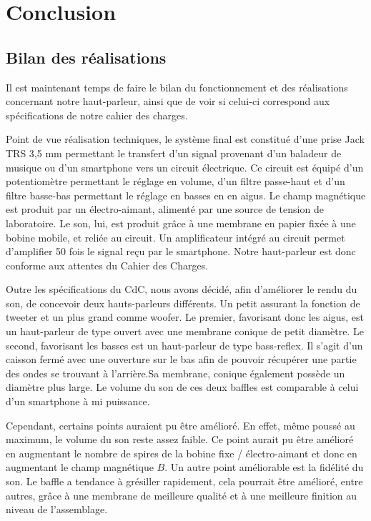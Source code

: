 \chapter{Conclusion}

\section{Bilan des réalisations}

Il est maintenant temps de faire le bilan du fonctionnement et des réalisations concernant notre haut-parleur, ainsi que de voir si celui-ci correspond aux spécifications de notre cahier des charges.

Point de vue réalisation techniques, le système final est constitué d'une prise Jack TRS 3,5 mm permettant le transfert d'un signal provenant d'un baladeur de musique ou d'un smartphone vers un circuit électrique. Ce circuit est équipé d'un potentiomètre permettant le réglage en volume, d'un filtre passe-haut et d'un filtre basse-bas permettant le réglage en basses en en aigus. Le champ magnétique est produit par un électro-aimant, alimenté par une source de tension de laboratoire. Le son, lui, est produit grâce à une membrane en papier fixée à une bobine mobile, et reliée au circuit. Un amplificateur intégré au circuit permet d'amplifier 50 fois le signal reçu par le smartphone. Notre haut-parleur est donc conforme aux attentes du Cahier des Charges.

Outre les spécifications du CdC, nous avons décidé, afin d'améliorer le rendu du son, de concevoir deux hauts-parleurs différents. Un petit assurant la fonction de tweeter et un plus grand comme woofer. Le premier, favorisant donc les aigus, est un haut-parleur de type ouvert avec une membrane conique de petit diamètre. Le second, favorisant les basses est un haut-parleur de type bass-reflex. Il s'agit d'un caisson fermé avec une ouverture sur le bas afin de pouvoir récupérer une partie des ondes se trouvant à l'arrière.Sa membrane, conique également possède un diamètre plus large. Le volume du son de ces deux baffles est comparable à celui d'un smartphone à mi puissance.

Cependant, certains points auraient pu être amélioré. En effet, même poussé au maximum, le volume du son reste assez faible. Ce point aurait pu être amélioré en augmentant le nombre de spires de la bobine fixe / électro-aimant et donc en augmentant le champ magnétique $B$. 
Un autre point améliorable est la fidélité du son. Le baffle a tendance à grésiller rapidement, cela pourrait être amélioré, entre autres, grâce à une membrane de meilleure qualité et à une meilleure finition au niveau de l'assemblage.

